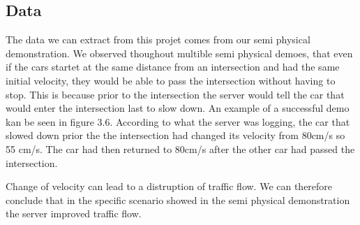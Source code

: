 \subsection{Data}
The data we can extract from this projet comes from our semi physical demonstration. We observed thoughout multible semi physical demoes, that even if the cars startet at the same distance from an intersection and had the same initial velocity, they would be able to pass the intersection without having to stop. This is because prior to the intersection the server would tell the car that would enter the intersection last to slow down. An example of a successful demo kan be seen in figure 3.6. According to what the server was logging, the car that slowed down prior the the intersection had changed its velocity from 80cm/s so 55 cm/s. The car had then returned to 80cm/s after the other car had passed the intersection.

Change of velocity can lead to a distruption of traffic flow. We can  therefore conclude that in the specific scenario showed in the semi physical demonstration the server improved traffic flow.
